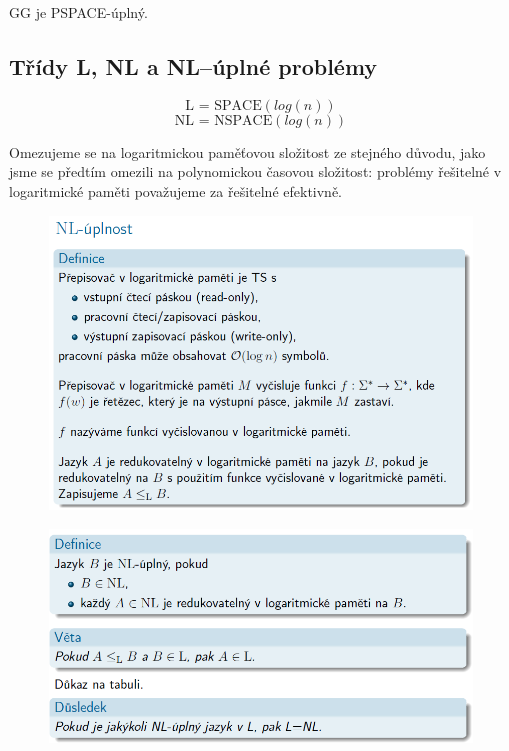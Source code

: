 \documentclass[10pt,a4paper]{article}
\theoremstyle{note}
\begin{document}
		GG je PSPACE-úplný.



	\subsection{Třídy L, NL a NL--úplné problémy}

		$$\text{L = SPACE}(log(n))$$
		$$\text{NL = NSPACE}(log(n))$$

	Omezujeme se na logaritmickou paměťovou složitost ze stejného důvodu, jako jsme se předtím omezili na
	 polynomickou časovou složitost: problémy řešitelné v logaritmické paměti považujeme za řešitelné efektivně.

		\begin{figure}[!h]
		\centering
		\includegraphics[width=13cm]{img/prepisovac.png}
		\end{figure}

		\begin{figure}[!h]
		\centering
		\includegraphics[width=13cm]{img/NLuplny.png}
		\end{figure}
\end{document}
